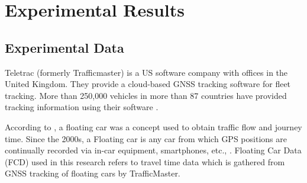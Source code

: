 \documentclass[journal]{IEEEtran}
\begin{document}
\section{Experimental Results}
\label{sec:results}
\subsection{Experimental Data}
Teletrac (formerly Trafficmaster) is a US software company with offices in the United Kingdom. They provide a cloud-based GNSS tracking software for fleet tracking. More than 250,000 vehicles in more than 87 countries have provided tracking information using their software \cite{teletracnavman2018}.

According to \cite{Wright1973}, a floating car was a concept used to obtain traffic flow and journey time. Since the 2000s, a Floating car is any car from which GPS positions are continually recorded via in-car equipment, smartphones, etc., \cite{Jones2013, Derrmann2016, Leodolter2015, Protschky2015, Protschky2015a, Rahmani2014, Rahmani2013, Wang2012, Pan2011, Fabritiis2008}. Floating Car Data (FCD) used in this research refers to travel time data which is gathered from GNSS tracking of floating cars by TrafficMaster.
\end{document}
